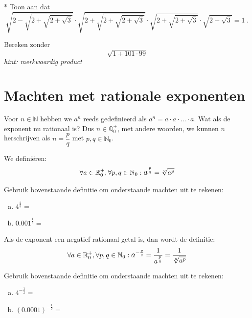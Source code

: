 \documentclass[12pt,twoside]{article}
\begin{document}
\begin{oefening}*
Toon aan dat
$$\sqrt{2-\sqrt{2+\sqrt{2+\sqrt{3}}}}\cdot\sqrt{2+\sqrt{2+\sqrt{2+\sqrt{3}}}}\cdot\sqrt{2+\sqrt{2+\sqrt{3}}}\cdot\sqrt{2+\sqrt{3}} = 1\;.$$
\end{oefening}

\begin{oefening}
Bereken zonder 
$$\sqrt{1+101\cdot99}$$
{\em hint: merkwaardig product}
\end{oefening}


\newpage
\section{Machten met rationale exponenten}

Voor $n\in\mathbb{N}$ hebben we $a^n$ reeds gedefinieerd als $a^n=a\cdot a\cdot \ldots \cdot a$. Wat als de exponent nu rationaal is? Dus $n\in\mathbb{Q}^+_0$, met andere woorden, we kunnen $n$ herschrijven als $n=\dfrac{p}{q}$ met $p,q\in\mathbb{N}_0$.

We definiëren:
$$\forall a \in \mathbb{R}^+_0, \forall p,q\in  \mathbb{N}_0: \mathlarger a^{\frac{p}{q}}=\sqrt[q]{a^p}$$

\begin{oefening}
Gebruik bovenstaande definitie om onderstaande machten uit te rekenen:\\
\begin{enumerate}[(a)]
  \itemsep1.5em
  \item $4^{\frac{2}{3}}=$\arulefill
  \item $0.001^{\frac{1}{3}}=$\arulefill
\end{enumerate}
\end{oefening}

Als de exponent een negatief rationaal getal is, dan wordt de definitie:
$$\forall a \in \mathbb{R}^+_0, \forall p,q\in  \mathbb{N}_0: \mathlarger a^{-\frac{p}{q}}=\dfrac{1}{a^{\frac{p}{q}}}=\dfrac{1}{\sqrt[q]{a^p}}$$

\begin{oefening}
Gebruik bovenstaande definitie om onderstaande machten uit te rekenen:\\
\begin{enumerate}[(a)]
  \itemsep1.5em
  \item $4^{-\frac{1}{2}}=$\arulefill
  \item $(0.0001)^{-\frac{1}{2}}=$\arulefill
\end{enumerate}
\end{oefening}
\end{document}
